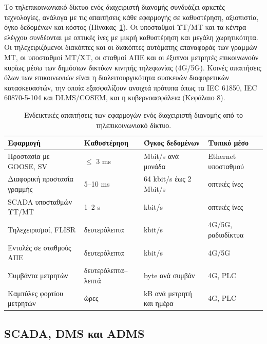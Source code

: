 Το τηλεπικοινωνιακό δίκτυο ενός διαχειριστή διανομής συνδυάζει αρκετές τεχνολογίες, ανάλογα
με τις απαιτήσεις κάθε εφαρμογής σε καθυστέρηση, αξιοπιστία, όγκο δεδομένων και κόστος
(Πίνακας~\ref{tab:comm-req}). Οι υποσταθμοί ΥΤ/ΜΤ και τα κέντρα ελέγχου συνδέονται με οπτικές
ίνες με μικρή καθυστέρηση και μεγάλη χωρητικότητα. Οι τηλεχειριζόμενοι διακόπτες και οι
διακόπτες αυτόματης επαναφοράς των γραμμών ΜΤ, οι υποσταθμοί ΜΤ/ΧΤ, οι σταθμοί ΑΠΕ και οι
έξυπνοι μετρητές επικοινωνούν κυρίως μέσω των δημόσιων δικτύων κινητής τηλεφωνίας (4G/5G).
Κοινές απαιτήσεις όλων των επικοινωνιών είναι η διαλειτουργικότητα συσκευών διαφορετικών κατασκευαστών, την οποία εξασφαλίζουν ανοιχτά
πρότυπα όπως τα IEC 61850, IEC 60870-5-104 και DLMS/COSEM, και η κυβερνοασφάλεια
(Κεφάλαιο 8).

\begin{table}[!htbp]
\centering
\begin{tabular}{llll}
\hline
Εφαρμογή & Καθυστέρηση & Όγκος δεδομένων & Τυπικό μέσο \\
\hline
Προστασία με GOOSE, SV & $\le$ 3 ms & Mbit/s ανά μονάδα & Ethernet υποσταθμού \\
Διαφορική προστασία γραμμής & 5--10 ms & 64 kbit/s έως 2 Mbit/s & οπτικές ίνες \\
SCADA υποσταθμών ΥΤ/ΜΤ & 1--2 s & kbit/s & οπτικές ίνες \\
Τηλεχειρισμοί, FLISR & δευτερόλεπτα & kbit/s & 4G/5G, ραδιοδίκτυα \\
Εντολές σε σταθμούς ΑΠΕ & δευτερόλεπτα & kbit/s & 4G/5G \\
Συμβάντα μετρητών & δευτερόλεπτα--λεπτά & byte ανά συμβάν & 4G, PLC \\
Καμπύλες φορτίου μετρητών & ώρες & kB ανά μετρητή και ημέρα & 4G, PLC \\
\hline
\end{tabular}
\caption{Ενδεικτικές απαιτήσεις των εφαρμογών ενός διαχειριστή διανομής από το
τηλεπικοινωνιακό δίκτυο.}
\label{tab:comm-req}
\end{table}

\subsection{SCADA, DMS και ADMS}
\label{sec:adms}

